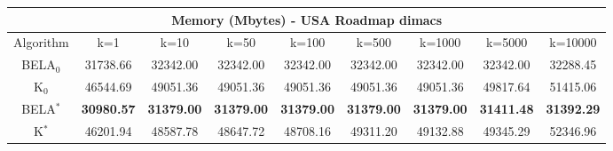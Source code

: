 \begin{tabular}{c|cccccccc}\toprule
\multicolumn{9}{c}{Memory (Mbytes) - USA Roadmap dimacs}\\ \midrule
Algorithm & k=1 & k=10 & k=50 & k=100 & k=500 & k=1000 & k=5000 & k=10000 \\ \midrule
BELA$_0$ & 31738.66 & 32342.00 & 32342.00 & 32342.00 & 32342.00 & 32342.00 & 32342.00 & 32288.45 \\
K$_0$ & 46544.69 & 49051.36 & 49051.36 & 49051.36 & 49051.36 & 49051.36 & 49817.64 & 51415.06 \\
BELA$^*$ & \textbf{30980.57} & \textbf{31379.00} & \textbf{31379.00} & \textbf{31379.00} & \textbf{31379.00} & \textbf{31379.00} & \textbf{31411.48} & \textbf{31392.29} \\
K$^*$ & 46201.94 & 48587.78 & 48647.72 & 48708.16 & 49311.20 & 49132.88 & 49345.29 & 52346.96 \\ \bottomrule 
\end{tabular}

